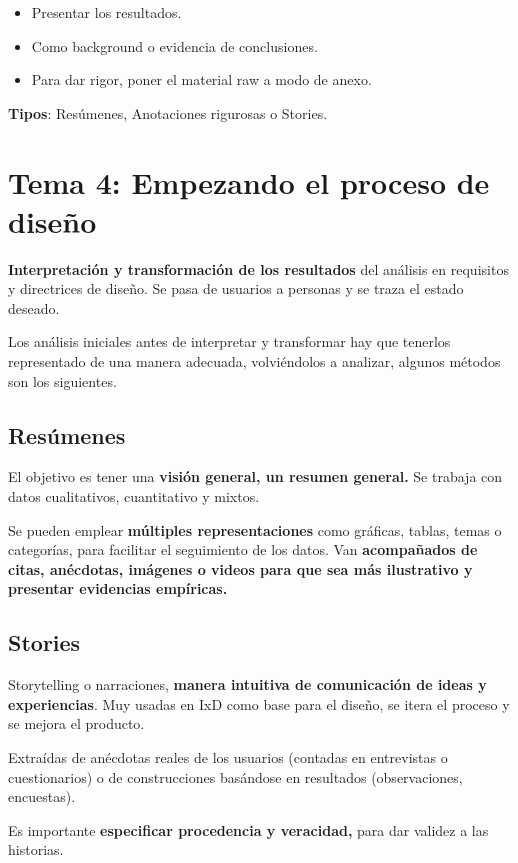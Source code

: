\documentclass[12pt]{report} %
\begin{document}
\begin{itemize}
\item
  Presentar los resultados.
\item
  Como background o evidencia de conclusiones.
\item
  Para dar rigor, poner el material raw a modo de anexo.
\end{itemize}

\textbf{Tipos}: Resúmenes, Anotaciones rigurosas o Stories.

\chapter{Tema 4: Empezando el proceso de diseño}

\textbf{Interpretación y transformación de los resultados} del análisis
en requisitos y directrices de diseño. Se pasa de usuarios a personas y
se traza el estado deseado.

Los análisis iniciales antes de interpretar y transformar hay que
tenerlos representado de una manera adecuada, volviéndolos a analizar,
algunos métodos son los siguientes.

\section{Resúmenes}

El objetivo es tener una \textbf{visión general, un resumen general.} Se
trabaja con datos cualitativos, cuantitativo y mixtos.

Se pueden emplear \textbf{múltiples representaciones} como gráficas,
tablas, temas o categorías, para facilitar el seguimiento de los datos.
Van \textbf{acompañados de citas, anécdotas, imágenes o videos para que
sea más ilustrativo y presentar evidencias empíricas.}

\section{Stories}

Storytelling o narraciones, \textbf{manera intuitiva de comunicación de
ideas y experiencias}. Muy usadas en IxD como base para el diseño, se
itera el proceso y se mejora el producto.

Extraídas de anécdotas reales de los usuarios (contadas en entrevistas o
cuestionarios) o de construcciones basándose en resultados (observaciones,
encuestas).

Es importante \textbf{especificar procedencia y veracidad,} para dar
validez a las historias.
\end{document}
